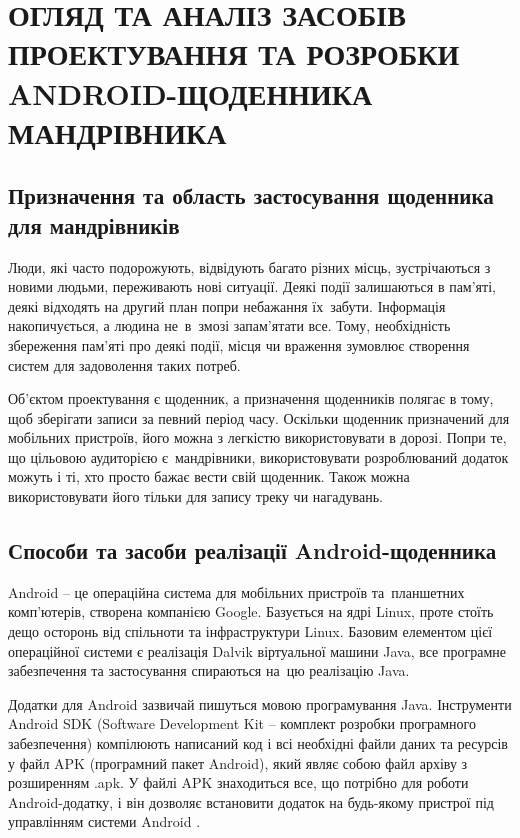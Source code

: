 \documentclass[../main.tex]{subfiles}
\begin{document}
\chapter{ОГЛЯД ТА АНАЛІЗ ЗАСОБІВ ПРОЕКТУВАННЯ ТА РОЗРОБКИ ANDROID-ЩОДЕННИКА МАНДРІВНИКА}

\section{Призначення та область застосування щоденника для мандрівників}

Люди, які часто подорожують, відвідують багато різних місць, зустрічаються з новими людьми, переживають нові ситуації. Деякі події залишаються в пам'яті, деякі відходять на другий план попри небажання їх~забути. Інформація накопичується, а людина не~в~змозі запам'ятати все. Тому, необхідність збереження пам'яті про деякі події, місця чи враження зумовлює створення систем для задоволення таких потреб.

Об'єктом проектування є щоденник, а призначення щоденників полягає в тому, щоб зберігати записи за певний період часу. Оскільки щоденник призначений для мобільних пристроїв, його можна з легкістю використовувати в дорозі. Попри те, що цільовою аудиторією є~мандрівники, використовувати розроблюваний додаток можуть і ті, хто просто бажає вести свій щоденник. Також можна використовувати його тільки для запису треку чи нагадувань.

\section{Способи та засоби реалізації Android-щоденника}

Android -- це операційна система для мобільних пристроїв та~планшетних комп'ютерів, створена компанією Google. Базується на ядрі Linux, проте стоїть дещо осторонь від спільноти та інфраструктури Linux. Базовим елементом цієї операційної системи є реалізація Dalvik віртуальної машини Java, все програмне забезпечення та застосування спираються на~цю реалізацію Java.

Додатки для Android зазвичай пишуться мовою програмування Java. Інструменти Android SDK (Software Development Kit -- комплект розробки програмного забезпечення) компілюють написаний код і всі необхідні файли даних та ресурсів у файл APK (програмний пакет Android), який являє собою файл архіву з розширенням .apk. У файлі APK знаходиться все, що потрібно для роботи Android-додатку, і він дозволяє встановити додаток на будь-якому пристрої під управлінням системи Android \cite{android_for_devs}. 
\end{document}
